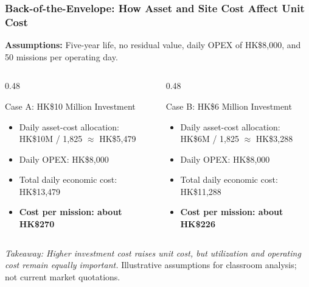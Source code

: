 \documentclass{beamer}
\begin{document}
\begin{frame}[t,shrink=12]
  \frametitle{Back-of-the-Envelope: How Asset and Site Cost Affect Unit Cost}
  \textbf{Assumptions:} Five-year life, no residual value, daily OPEX of HK\$8,000, and 50 missions per operating day.
  \begin{columns}[T]
    \begin{column}{0.48\textwidth}
      \begin{block}{Case A: HK\$10 Million Investment}
      \begin{itemize}
        \item Daily asset-cost allocation: HK\$10M / 1,825 $\approx$ HK\$5,479
        \item Daily OPEX: HK\$8,000
        \item Total daily economic cost: HK\$13,479
        \item \textbf{Cost per mission: about HK\$270}
      \end{itemize}
      \end{block}
    \end{column}
    \begin{column}{0.48\textwidth}
      \begin{block}{Case B: HK\$6 Million Investment}
      \begin{itemize}
        \item Daily asset-cost allocation: HK\$6M / 1,825 $\approx$ HK\$3,288
        \item Daily OPEX: HK\$8,000
        \item Total daily economic cost: HK\$11,288
        \item \textbf{Cost per mission: about HK\$226}
      \end{itemize}
      \end{block}
    \end{column}
  \end{columns}
  \textit{Takeaway: Higher investment cost raises unit cost, but utilization and operating cost remain equally important.}
  \vfill
  {\tiny Illustrative assumptions for classroom analysis; not current market quotations.}
\end{frame}
\end{document}
